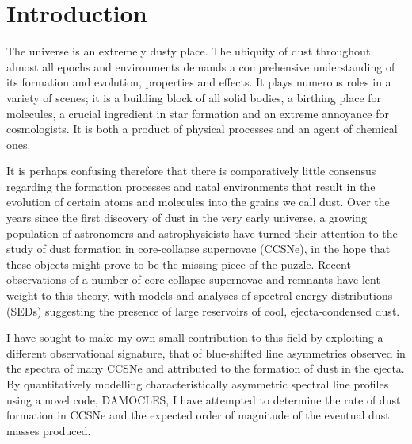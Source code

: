 \chapter{Introduction}\label{chp:chp1}

%
%



The universe is an extremely dusty place.  The ubiquity of dust throughout almost all epochs and environments demands a comprehensive understanding of its formation and evolution, properties and effects.  It plays numerous roles in a variety of scenes; it is a building block of  all solid bodies, a birthing place for molecules, a crucial ingredient in star formation and an extreme annoyance for cosmologists.  It is both a product of physical processes and an agent of chemical ones.

It is perhaps confusing therefore that there is comparatively little consensus regarding the formation processes and natal environments that result in the evolution of certain atoms and molecules into the grains we call dust.  Over the years since the first discovery  of dust in the very early universe, a growing population of astronomers and astrophysicists have turned their attention to the study of dust formation in core-collapse supernovae (CCSNe), in the hope that these objects might prove to be the missing piece of the puzzle.  Recent observations of a number of core-collapse supernovae  and remnants have lent weight to this theory, with models and analyses of spectral energy distributions (SEDs)  suggesting the presence of large reservoirs of cool, ejecta-condensed dust. 

I have sought to make my own small contribution to this field by exploiting a different observational signature, that of  blue-shifted line asymmetries observed in the spectra of many CCSNe and attributed to the formation of dust in the ejecta.  By quantitatively modelling characteristically asymmetric spectral line profiles using a novel code, DAMOCLES, I have attempted to determine the rate of dust formation in CCSNe and the expected order of magnitude of the eventual dust masses produced.

